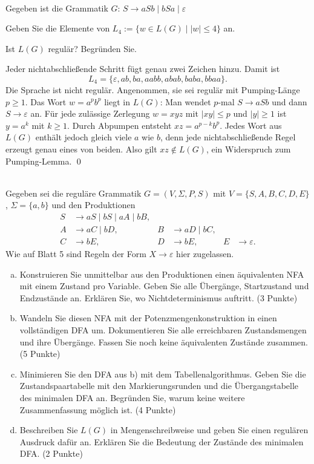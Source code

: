 \\
Gegeben ist die Grammatik $G$:
$S\rightarrow aSb \mid bSa \mid \varepsilon$

Geben Sie die Elemente von $L_4:=\{w\in L(G)\mid |w|\leq 4\}$ an.

Ist $L(G)$ regulär? Begründen Sie.

\begin{loesung}

Jeder nichtabschließende Schritt fügt genau zwei Zeichen hinzu. Damit ist
\[
L_4=\{\varepsilon,ab,ba,aabb,abab,baba,bbaa\}.
\]
Die Sprache ist nicht regulär. Angenommen, sie sei regulär mit Pumping-Länge $p\geq1$.
Das Wort $w=a^pb^p$ liegt in $L(G)$: Man wendet $p$-mal $S\to aSb$ und dann
$S\to\varepsilon$ an. Für jede zulässige Zerlegung $w=xyz$ mit $|xy|\leq p$
und $|y|\geq1$ ist $y=a^k$ mit $k\geq1$.
Durch Abpumpen entsteht $xz=a^{p-k}b^p$.
Jedes Wort aus $L(G)$ enthält jedoch gleich viele $a$ wie $b$, denn jede
nichtabschließende Regel erzeugt genau eines von beiden. Also gilt $xz\notin L(G)$,
ein Widerspruch zum Pumping-Lemma. \qed
\end{loesung}


\\
Gegeben sei die reguläre Grammatik $G=(V,\Sigma,P,S)$ mit
$V=\{S,A,B,C,D,E\}$, $\Sigma=\{a,b\}$ und den Produktionen
\[
\begin{aligned}
S&\to aS\mid bS\mid aA\mid bB,\\
A&\to aC\mid bD, & B&\to aD\mid bC,\\
C&\to bE, & D&\to bE, & E&\to\varepsilon.
\end{aligned}
\]
Wie auf Blatt 5 sind Regeln der Form $X\to\varepsilon$ hier zugelassen.
\begin{enumerate}[a)]
\item Konstruieren Sie unmittelbar aus den Produktionen einen äquivalenten NFA
mit einem Zustand pro Variable. Geben Sie alle Übergänge, Startzustand und
Endzustände an. Erklären Sie, wo Nichtdeterminismus auftritt. (3 Punkte)
\item Wandeln Sie diesen NFA mit der Potenzmengenkonstruktion in einen
vollständigen DFA um. Dokumentieren Sie alle erreichbaren Zustandsmengen
und ihre Übergänge. Fassen Sie noch keine äquivalenten Zustände zusammen. (5 Punkte)
\item Minimieren Sie den DFA aus b) mit dem Tabellenalgorithmus. Geben Sie die
Zustandspaartabelle mit den Markierungsrunden und die Übergangstabelle
des minimalen DFA an.
Begründen Sie, warum keine weitere Zusammenfassung möglich ist. (4 Punkte)
\item Beschreiben Sie $L(G)$ in Mengenschreibweise und geben Sie einen
regulären Ausdruck dafür an. Erklären Sie die Bedeutung der Zustände
des minimalen DFA. (2 Punkte)
\end{enumerate}

